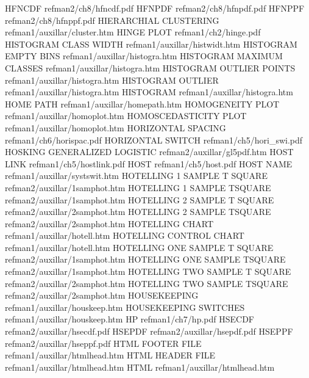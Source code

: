HFNCDF                                  refman2/ch8/hfncdf.pdf
HFNPDF                                  refman2/ch8/hfnpdf.pdf
HFNPPF                                  refman2/ch8/hfnppf.pdf
HIERARCHIAL CLUSTERING                  refman1/auxillar/cluster.htm
HINGE PLOT                              refman1/ch2/hinge.pdf
HISTOGRAM CLASS WIDTH                   refman1/auxillar/histwidt.htm
HISTOGRAM EMPTY BINS                    refman1/auxillar/histogra.htm
HISTOGRAM MAXIMUM CLASSES               refman1/auxillar/histogra.htm
HISTOGRAM OUTLIER POINTS                refman1/auxillar/histogra.htm
HISTOGRAM OUTLIER                       refman1/auxillar/histogra.htm
HISTOGRAM                               refman1/auxillar/histogra.htm
HOME PATH                               refman1/auxillar/homepath.htm
HOMOGENEITY PLOT                        refman1/auxillar/homoplot.htm
HOMOSCEDASTICITY PLOT                   refman1/auxillar/homoplot.htm
HORIZONTAL SPACING                      refman1/ch6/horispac.pdf
HORIZONTAL SWITCH                       refman1/ch5/hori_swi.pdf
HOSKING GENERALIZED LOGISTIC            refman2/auxillar/gl5pdf.htm
HOST LINK                               refman1/ch5/hostlink.pdf
HOST                                    refman1/ch5/host.pdf
HOST NAME                               refman1/auxillar/systswit.htm
HOTELLING 1 SAMPLE T SQUARE             refman2/auxillar/1samphot.htm
HOTELLING 1 SAMPLE TSQUARE              refman2/auxillar/1samphot.htm
HOTELLING 2 SAMPLE T SQUARE             refman2/auxillar/2samphot.htm
HOTELLING 2 SAMPLE TSQUARE              refman2/auxillar/2samphot.htm
HOTELLING CHART                         refman1/auxillar/hotell.htm
HOTELLING CONTROL CHART                 refman1/auxillar/hotell.htm
HOTELLING ONE SAMPLE T SQUARE           refman2/auxillar/1samphot.htm
HOTELLING ONE SAMPLE TSQUARE            refman2/auxillar/1samphot.htm
HOTELLING TWO SAMPLE T SQUARE           refman2/auxillar/2samphot.htm
HOTELLING TWO SAMPLE TSQUARE            refman2/auxillar/2samphot.htm
HOUSEKEEPING                            refman1/auxillar/houskeep.htm
HOUSEKEEPING SWITCHES                   refman1/auxillar/houskeep.htm
HP                                      refman1/ch7/hp.pdf
HSECDF                                  refman2/auxillar/hsecdf.pdf
HSEPDF                                  refman2/auxillar/hsepdf.pdf
HSEPPF                                  refman2/auxillar/hseppf.pdf
HTML FOOTER FILE                        refman1/auxillar/htmlhead.htm
HTML HEADER FILE                        refman1/auxillar/htmlhead.htm
HTML                                    refman1/auxillar/htmlhead.htm
